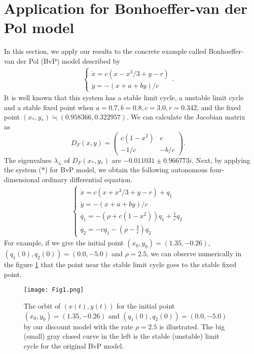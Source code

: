 \documentclass[11pt,reqno]{amsart}
\begin{document}
\section{Application for Bonhoeffer-van der Pol model}\label{application}
In this section, we apply our results to the concrete example called Bonhoeffer-van der Pol (BvP) model described by
\begin{eqnarray}
\begin{cases}
\dot{x}=c(x-x^3/3+y-r)\\
\dot{y}=-(x+a+by)/c
\end{cases}.
\end{eqnarray}
It is well known that this system has a stable limit cycle, a unstable limit cycle and a stable fixed point when $a=0.7,b=0.8,c=3.0,r=0.342$, and the fixed point $(x_*,y_*)\fallingdotseq (0.958366,0.322957)$. We can calculate the Jacobian matrix as
$$
D_F(x,y)=\begin{pmatrix}
c(1-x^2) & c \\
-1/c & -b/c
\end{pmatrix}.
$$ 
The eigenvalues $\lambda_{\pm}$ of $D_F(x_*,y_*)$ are $- 0.011031\pm 0.966773i$. Next, by applying the system ($\ast$) for BvP model, we obtain the following autonomous four-dimensional ordinary differential equation.
\begin{eqnarray}
\begin{cases}
\dot{x}=c(x+x^3/3+y-r)+q_1\\
\dot{y}=-(x+a+by)/c\\
\dot{q_1}=-(\rho+c(1-x^2))q_1+\frac{1}{c}q_2\\
\dot{q_2}=-cq_1-(\rho-\frac{b}{c})q_2
\end{cases}
\end{eqnarray}
For example, if we give the initial point $(x_0,y_0)=(1.35,-0.26)$, $(q_1(0),q_2(0))=(0.0,-5.0)$ and $\rho=2.5$, we can observe numerically in the figure \ref{fig1} that the point near the stable limit cycle goes to the stable fixed point.


\begin{figure}[htp]
\begin{center}
\texttt{[image: Fig1.png]}
\caption{The orbit of $(x(t),y(t))$ for the initial point $(x_0,y_0)=(1.35,-0.26)$ and $(q_1(0),q_2(0))=(0.0,-5.0)$ by our discount model with the rate $\rho=2.5$ is illustrated. The big (small) gray closed curve in the left is the stable (unstable) limit cycle for the original BvP model.  }
\label{fig1}
\end{center}
\end{figure}
\end{document}
